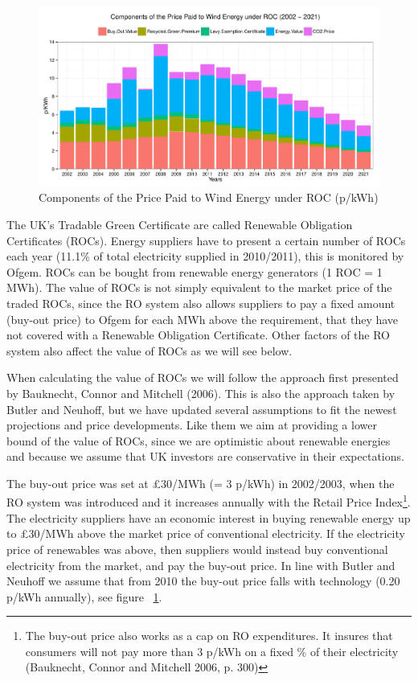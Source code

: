 \documentclass[a4paper, 12pt]{article}
\begin{document}
\begin{figure}
	\centering
	\includegraphics[width=1\textwidth]{figure_roc-price-components}
	\caption{Components of the Price Paid to Wind Energy under ROC (p/kWh)}
	\label{fig:figure_roc-price-components}
\end{figure}

The UK's Tradable Green Certificate are called Renewable Obligation Certificates (ROCs). Energy suppliers have to present a certain number of ROCs each year (11.1\% of total electricity supplied in 2010/2011), this is monitored by Ofgem. ROCs can be bought from renewable energy generators (1 ROC = 1 MWh). The value of ROCs is not simply equivalent to the market price of the traded ROCs, since the RO system also allows suppliers to pay a fixed amount (buy-out price) to Ofgem for each MWh above the requirement, that they have not covered with a Renewable Obligation Certificate. Other factors of the RO system also affect the value of ROCs as we will see below.

When calculating the value of ROCs we will follow the approach first presented by Bauknecht, Connor and Mitchell (2006). This is also the approach taken by Butler and Neuhoff, but we have updated several assumptions to fit the newest projections and price developments. Like them we aim at providing a lower bound of the value of ROCs, since we are optimistic about renewable energies and because we assume that UK investors are conservative in their expectations.

The buy-out price was set at £30/MWh (= 3 p/kWh) in 2002/2003, when the RO system was introduced and it increases annually with the Retail Price Index\footnote{The buy-out price also works as a cap on RO expenditures. It insures that consumers will not pay more than 3 p/kWh on a fixed \% of their electricity (Bauknecht, Connor and Mitchell 2006, p. 300)}. The electricity suppliers have an economic interest in buying renewable energy up to £30/MWh above the market price of conventional electricity. If the electricity price of renewables was above, then suppliers would instead buy conventional electricity from the market, and pay the buy-out price. In line with Butler and Neuhoff we assume that from 2010 the buy-out price falls with technology (0.20 p/kWh annually), see figure ~\ref{fig:figure_roc-price-components}.
\end{document}
